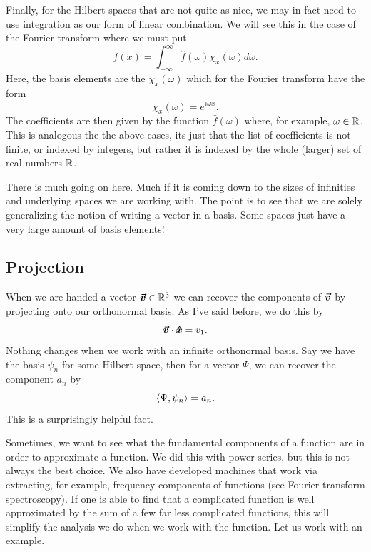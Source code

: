 Finally, for the Hilbert spaces that are not quite as nice, we may in fact need to use integration as our form of linear combination.  We will see this in the case of the Fourier transform where we must put
\[
f(x)=\int_{-\infty}^\infty \hat{f}(\omega) \chi_x(\omega)d\omega.
\]
Here, the basis elements are the $\chi_x(\omega)$ which for the Fourier transform have the form
\[
\chi_x(\omega) = e^{i\omega x}.
\]
The coefficients are then given by the function $\hat{f}(\omega)$ where, for example, $\omega \in \mathbb{R}$. This is analogous the the above cases, its just that the list of coefficients is not finite, or indexed by integers, but rather it is indexed by the whole (larger) set of real numbers $\mathbb{R}$.  

\begin{remark}
	There is much going on here. Much if it is coming down to the sizes of infinities and underlying spaces we are working with.  The point is to see that we are solely generalizing the notion of writing a vector in a basis. Some spaces just have a very large amount of basis elements!	
\end{remark}

\subsection{Projection}

When we are handed a vector $\boldsymbol{\boldsymbol{\vec{v}}}\in \mathbb{R}^3$ we can recover the components of $\boldsymbol{\boldsymbol{\vec{v}}}$ by projecting onto our orthonormal basis.  As I've said before, we do this by
\[
\boldsymbol{\boldsymbol{\vec{v}}} \cdot \boldsymbol{\hat{x}} = v_1.
\]
Nothing changes when we work with an infinite orthonormal basis.  Say we have the basis $\psi_n$ for some Hilbert space,  then for a vector $\Psi$, we can recover the component $a_n$ by
\[
\left\langle \Psi, \psi_n \right\rangle=a_n.
\]
This is a surprisingly helpful fact.

Sometimes, we want to see what the fundamental components of a function are in order to approximate a function.  We did this with power series, but this is not always the best choice.  We also have developed machines that work via extracting, for example, frequency components of functions (see Fourier transform spectroscopy).  If one is able to find that a complicated function is well approximated by the sum of a few far less complicated functions, this will simplify the analysis we do when we work with the function. Let us work with an example.

